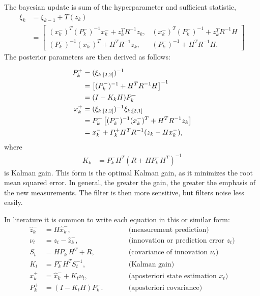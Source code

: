 The bayesian update is sum of the hyperparameter and sufficient statistic,
\begin{align}
    \xi_{k}
    &= \xi_{k-1} +  T(z_{k})  \nonumber \\
    &=
    \begin{bmatrix}
    (x_{k}^{-})^{T} (P_{k}^{-})^{-1} x_{k}^{-} + z_{k}^{T} R^{-1} z_{k},
    & (x_{k}^{-})^{T} (P_{k}^{-})^{-1} + z_{k}^{T} R^{-1} H \\
    (P_{k}^{-})^{-1} (x_{k}^{-})^{T} + H^{T} R^{-1} z_{k},
    & (P_{k}^{-})^{-1} + H^{T} R^{-1} H.
    \end{bmatrix}
\end{align}
The posterior parameters are then derived as follows:

\begin{align}
    P_{k}^{+} &= (\xi_{k;[2,2]})^{-1} \notag\\
    &= \left[ (P_{k}^{-})^{-1} + H^{T} R^{-1} H \right]^{-1} \notag\\
    &= (I - K_{k} H) P_{k}^{-} \\
    x_{k}^{+} &= (\xi_{k;[2,2]})^{-1} \xi_{k;[2,1]} \notag\\
    &= P_{k}^{+} \left[ (P_{k}^{-})^{-1} (x_{k}^{-})^{T} + H^{T} R^{-1} z_{k}\right] \notag \\
    &= x_{k}^{-} + P_{k}^{+} H^{T} R^{-1}(z_{k} - Hx_{k}^{-}),
\end{align}
where
\begin{align}
    K_{k} &= P_{k}^{-} H^{T}(R + H P_{k}^{-}H^{T})^{-1} \label{eq:kalman_gain}
\end{align}
is Kalman gain. This form is the optimal Kalman gain, as it minimizes the root mean squared error. In general, the greater the gain, the greater the emphasis of the new measurements. The filter is then more sensitive, but filters noise less easily.

In literature it is common to write each equation in this or similar form:
\begin{align}
    \hat{z}_{k}^{-} &= H \hat{x}_{k}^{-}, \qquad &&\text{(measurement prediction)} \\
    \nu_t &= z_t - \hat{z}_{k}^{-}, \qquad &&\text{(innovation or prediction error $z_t$)} \\
    S_t &= H P_{k}^{-} H^T + R, \qquad &&\text{(covariance of innovation $\nu_t$)} \\
    K_t &= P_{k}^{-} H^T S_t^{-1}, \qquad &&\text{(Kalman gain)} \\
    {x}_{k}^{+} &= \hat{x}_{k}^{-} + K_t \nu_t, \qquad &&\text{(aposteriori state estimation $x_t$)} \\
    P_{k}^{+} &= (I - K_t H) P_{k}^{-}. \qquad &&\text{(aposteriori covariance)}
\end{align}

